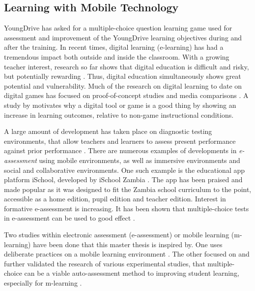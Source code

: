 \subsection{Learning with Mobile Technology}

    YoungDrive has asked for a multiple-choice question learning game used for assessment and improvement of the YoungDrive learning objectives during and after the training. In recent times, digital learning (e-learning) has had a tremendous impact both outside and inside the classroom. With a growing teacher interest, research so far shows that digital education is difficult and risky, but potentially rewarding \citep{luckin}. Thus, digital education simultaneously shows great potential and vulnerability. Much of the research on digital learning to date on digital games has focused on proof-of-concept studies and media comparisons \citep{luckin}. A study by \cite{gates} motivates why a digital tool or game is a good thing by showing an increase in learning outcomes, relative to non-game instructional conditions.


    A large amount of development has taken place on diagnostic testing environments, that allow teachers and learners to assess present performance against prior performance \citep{luckin}. There are numerous examples of developments in \textit{e-assessment} using mobile environments, as well as immersive environments and social and collaborative environments. One such example is the educational app platform iSchool, developed by iSchool Zambia \citep{ischool}. The app has been praised and made popular as it was designed to fit the Zambia school curriculum to the point, accessible as a home edition, pupil edition and teacher edition. Interest in formative e-assessment is increasing.  It has been shown that multiple-choice tests in e-assessment can be used to good effect \citep{nicol}.

    Two studies within electronic assessment (e-assessment) or mobile learning (m-learning) have been done that this master thesis is inspired by. One uses deliberate practices on a mobile learning environment \citep{yengin}. The other focused on and further validated the research of various experimental studies, that multiple-choice can be a viable auto-assessment method to improving student learning, especially for m-learning \citep{de-marcos}.

